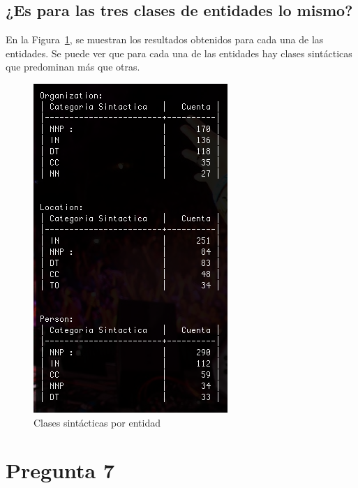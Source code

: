 \documentclass{article}
\begin{document}
\subsection{¿Es para las tres clases de entidades lo mismo?}
En la Figura~\ref{fig:pregunta6c}, se muestran los resultados obtenidos para cada una de las entidades. Se puede ver que para cada una de las entidades hay clases sintácticas que predominan más que otras.
\begin{figure}[h!]
\centering
\includegraphics[scale=0.6]{figuras/pregunta6c.png}
\caption{Clases sintácticas por entidad}
\label{fig:pregunta6c}
\end{figure}


\section{Pregunta 7}
\end{document}
